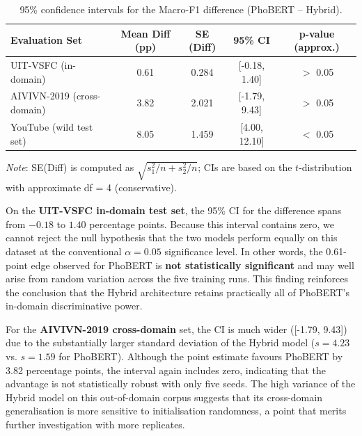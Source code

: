 \documentclass[12pt]{report} %
\begin{document}
\begin{table}[htbp]
    \centering
    \caption{95\% confidence intervals for the Macro-F1 difference (PhoBERT – Hybrid).}
    \label{tab:significance}
    \begin{tabular}{lcccc}
        \toprule
        \textbf{Evaluation Set}    & \textbf{Mean Diff (pp)} & \textbf{SE (Diff)} & \textbf{95\% CI}  & \textbf{p-value (approx.)} \\
        \midrule
        UIT-VSFC (in-domain)       & 0.61                    & 0.284              & {[}-0.18, 1.40{]} & $>$ 0.05                   \\
        AIVIVN-2019 (cross-domain) & 3.82                    & 2.021              & {[}-1.79, 9.43{]} & $>$ 0.05                   \\
        YouTube (wild test set)    & 8.05                    & 1.459              & {[}4.00, 12.10{]} & $<$ 0.05                   \\
        \bottomrule
    \end{tabular}
    \smallskip
    \emph{Note}: SE(Diff) is computed as \(\sqrt{s_1^2/n + s_2^2/n}\); CIs are based on the \(t\)-distribution with approximate df = 4 (conservative).
\end{table}

On the \textbf{UIT-VSFC in-domain test set}, the 95\% CI for the difference spans from \( -0.18 \) to \( 1.40 \) percentage points. Because this interval contains zero, we cannot reject the null hypothesis that the two models perform equally on this dataset at the conventional \(\alpha = 0.05\) significance level. In other words, the 0.61-point edge observed for PhoBERT is \textbf{not statistically significant} and may well arise from random variation across the five training runs. This finding reinforces the conclusion that the Hybrid architecture retains practically all of PhoBERT's in-domain discriminative power.

For the \textbf{AIVIVN-2019 cross-domain} set, the CI is much wider ({[}-1.79, 9.43{]}) due to the substantially larger standard deviation of the Hybrid model (\(s=4.23\) vs. \(s=1.59\) for PhoBERT). Although the point estimate favours PhoBERT by 3.82 percentage points, the interval again includes zero, indicating that the advantage is not statistically robust with only five seeds. The high variance of the Hybrid model on this out-of-domain corpus suggests that its cross-domain generalisation is more sensitive to initialisation randomness, a point that merits further investigation with more replicates.
\end{document}
